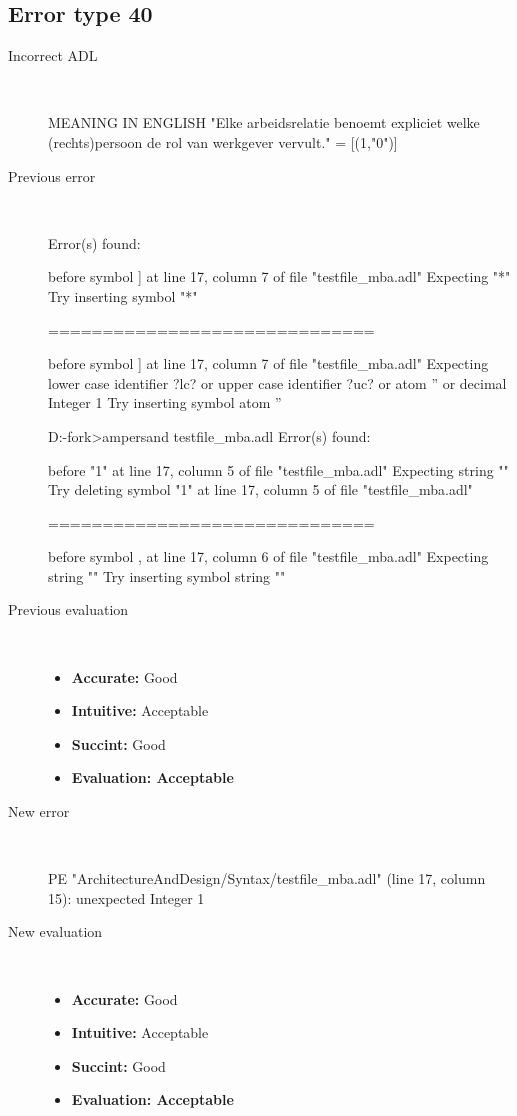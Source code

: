 \hrulefill

\subsection{Error type 40}
  \begin{description}
  \item[Incorrect ADL]~\\
\begin{adl}
MEANING IN ENGLISH "Elke arbeidsrelatie benoemt expliciet welke (rechts)persoon de rol van werkgever vervult."
= [(1,"0")]\end{adl}
  \item[Previous error]~\\
\begin{haskell}
Error(s) found:

before symbol ] at line 17, column 7 of file "testfile_mba.adl"
Expecting "*"
Try inserting symbol "*"

==============================

before symbol ] at line 17, column 7 of file "testfile_mba.adl"
Expecting lower case identifier ?lc? or upper case identifier ?uc? or atom '' or
 decimal Integer 1
Try inserting symbol atom ''


D:\ampersand-fork\ArchitectureAndDesign\Syntax>ampersand testfile_mba.adl
Error(s) found:

before "1" at line 17, column 5 of file "testfile_mba.adl"
Expecting string ""
Try deleting symbol "1" at line 17, column 5 of file "testfile_mba.adl"

==============================

before symbol , at line 17, column 6 of file "testfile_mba.adl"
Expecting string ""
Try inserting symbol string ""
\end{haskell}
  \item[Previous evaluation]~\\
    \begin{itemize}
    \item \textbf{Accurate:} Good
    \item \textbf{Intuitive:} Acceptable
    \item \textbf{Succint:} Good
    \item \textbf{Evaluation: Acceptable}
    \end{itemize}
  \item[New error]~\\
\begin{haskell}
PE "ArchitectureAndDesign/Syntax/testfile_mba.adl" (line 17, column 15):
unexpected Integer 1\end{haskell}
  \item[New evaluation]~\\
    \begin{itemize}
    \item \textbf{Accurate:} Good
    \item \textbf{Intuitive:} Acceptable
    \item \textbf{Succint:} Good
    \item \textbf{Evaluation: Acceptable
}
    \end{itemize}
  \end{description}

